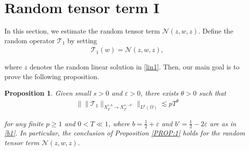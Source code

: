 \documentclass[%
11pt,  reqno]{amsart}
\newtheorem{proposition}[theorem]{Proposition}
\newcommand{\1}{\hspace{0.2mm}\text{I}\hspace{0.2mm}}
\newcommand{\noi}{\noindent}
\newcommand{\eps}{\varepsilon}
\newcommand{\ta}{\theta}
\renewcommand{\O}{\Omega}
\newcommand{\les}{\lesssim}
\newcommand{\NN}{\mathcal{N}}
\numberwithin{equation}{section}
\numberwithin{theorem}{section}
\newcommand{\TT}{\mathcal{T}}
\begin{document}
\section{Random tensor term I}
\label{SEC:RT1}

In this section, we estimate
the  random tensor term
 $\NN(z, w, z)$. 
Define the random operator $\TT_1$
by setting
\begin{align}\label{RT0}
\TT_1(w) =  \NN (z, w,z), 
\end{align}

\noi
where $z$ denotes the random linear solution in \eqref{lin1}.
Then, our main goal is to prove the following proposition.




\begin{proposition}
\label{PROP:RT1}
Given small   $s > 0$ and $\eps > 0$, 
 there exists $\ta > 0$
such that 
\begin{align}
\Big\| \| \TT_1 \|_{X^{s,b}_T \to 
X^{s,-b'}_T} \Big\|_{L^p (\O)} 
\les p  T^\ta
\label{RT0a}
\end{align}

\noi
for any finite $p \ge 1$ and $0 < T\ll 1$, where 
$b = \frac 12 + \eps$ and $b' = \frac 12 - 2\eps$
are as in \eqref{b1}.
In particular, 
 the conclusion of Proposition \ref{PROP:1}
holds
for the random tensor term $\NN(z, w, z)$.




\end{proposition}
\end{document}

